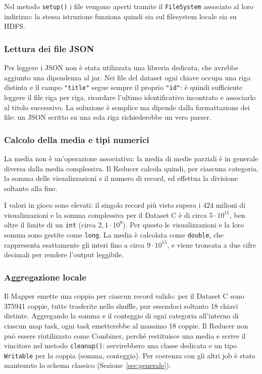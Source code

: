 \documentclass[12pt, a4paper]{article}
\begin{document}
Nel metodo \texttt{setup()} i file vengono aperti tramite
il \texttt{FileSystem} associato al loro indirizzo:
la stessa istruzione funziona quindi sia sul filesystem
locale sia su HDFS.

\subsubsection{Lettura dei file JSON}

Per leggere i JSON non è stata utilizzata una libreria
dedicata, che avrebbe aggiunto una dipendenza al jar.
Nei file del dataset ogni chiave occupa una riga distinta
e il campo \texttt{"title"} segue sempre il proprio
\texttt{"id"}: è quindi sufficiente leggere il file riga
per riga, ricordare l'ultimo identificativo incontrato
e associarlo al titolo successivo.
La soluzione è semplice ma dipende dalla formattazione
dei file: un JSON scritto su una sola riga richiederebbe
un vero parser.

\subsubsection{Calcolo della media e tipi numerici}

La media non è un'operazione associativa: la media
di medie parziali è in generale diversa dalla media
complessiva. Il Reducer calcola quindi, per ciascuna
categoria, la somma delle visualizzazioni e il numero
di record, ed effettua la divisione soltanto alla fine.

I valori in gioco sono elevati: il singolo record più visto
supera i 424 milioni di visualizzazioni e la somma
complessiva per il Dataset C è di circa $5 \cdot 10^{11}$,
ben oltre il limite di un \texttt{int} (circa $2{,}1 \cdot 10^{9}$).
Per questo le visualizzazioni e la loro somma sono gestite
come \texttt{long}. La media è calcolata come \texttt{double},
che rappresenta esattamente gli interi fino a circa
$9 \cdot 10^{15}$, e viene troncata a due cifre decimali
per rendere l'output leggibile.

\subsubsection{Aggregazione locale}

Il Mapper emette una coppia per ciascun record valido:
per il Dataset C sono 375941 coppie, tutte trasferite
nello shuffle, pur essendoci soltanto 18 chiavi distinte.
Aggregando la somma e il conteggio di ogni categoria
all'interno di ciascun map task, ogni task emetterebbe
al massimo 18 coppie.
Il Reducer non può essere riutilizzato come Combiner,
perché restituisce una media e scrive il vincitore nel metodo
\texttt{cleanup()}: servirebbero una classe dedicata e un tipo
\texttt{Writable} per la coppia (somma, conteggio).
Per coerenza con gli altri job è stato mantenuto lo schema
classico (Sezione~\ref{sec:generale}).
\end{document}
